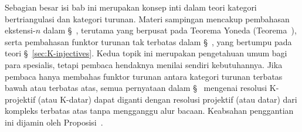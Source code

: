 \begin{petunjukbacaan}
	Sebagian besar isi bab ini merupakan konsep inti dalam teori kategori
	bertriangulasi dan kategori turunan. Materi sampingan mencakup pembahasan
	ekstensi-$n$ dalam \S~, terutama yang
	berpusat pada Teorema Yoneda
	(Teorema~), serta pembahasan
	funktor turunan tak terbatas dalam
	\S~, yang bertumpu pada teori
	\S~\ref{sec:K-injectives}. Kedua topik ini merupakan pengetahuan umum bagi
	para spesialis, tetapi pembaca hendaknya menilai sendiri kebutuhannya.
	Jika pembaca hanya membahas funktor turunan antara kategori turunan
	terbatas bawah atau terbatas atas, semua pernyataan dalam
	\S~ mengenai resolusi K-projektif (atau
	K-datar) dapat diganti dengan resolusi projektif (atau datar) dari kompleks
	terbatas atas tanpa mengganggu alur bacaan. Keabsahan penggantian ini
	dijamin oleh Proposisi~.
\end{petunjukbacaan}
